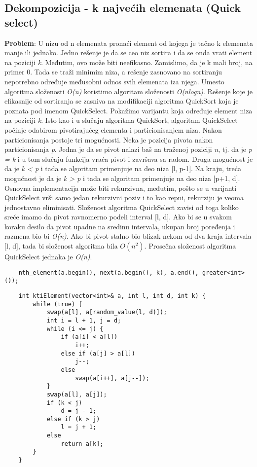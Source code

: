 \documentclass{article}
\begin{document}
\subsection{Dekompozicija - k najvećih elemenata (Quick select)}
\textbf{Problem}: U nizu od n elemenata pronaći element od kojega je tačno k elemenata
manje ili jednako.
\newline
Jedno rešenje je da se ceo niz sortira i da se onda vrati element na poziciji \textit{k}.
Međutim, ovo može biti neefikasno. Zamislimo, da je k mali broj, na primer
0. Tada se traži minimim niza, a rešenje zasnovano na sortiranju nepotrebno
određuje međusobni odnos svih elemenata iza njega. Umesto algoritma složenosti
\textit{O(n)} koristimo algoritam složenosti \textit{O(nlogn)}.
\newline
Rešenje koje je efikasnije od sortiranja se zasniva na modifikaciji algoritma
QuickSort koja je poznata pod imenom QuickSelect. Pokažimo varijantu koja
određuje element niza na poziciji \textit{k}.
\newline
Isto kao i u slučaju algoritma QuickSort, algoritam QuickSelect počinje odabirom
pivotirajućeg elementa i particionisanjem niza. Nakon particionisanja postoje tri
mogućnosti. Neka je pozicija pivota nakon particionisanja \textit{p}. Jedna je da se pivot
nalazi baš na traženoj poziciji \textit{n}, tj. da je \textit{p = k} i u tom slučaju funkcija vraća
pivot i završava sa radom. Druga mogućnost je da je \textit{k < p} i tada se algoritam
primenjuje na deo niza [l, p-1]. Na kraju, treća mogućnost je da je 
\textit{k > p} i
tada se algoritam primenjuje na deo niza [p+1, d]. Osnovna implementacija
može biti rekurzivna, međutim, pošto se u varijanti QuickSelect vrši samo jedan rekurzivni poziv i to
kao repni, rekurziju je veoma jednostavno eliminisati.
\newline
Složenost algoritma QuickSelect zavisi od
toga koliko sreće imamo da pivot ravnomerno podeli interval [l, d]. Ako bi se u
svakom koraku desilo da pivot upadne na sredinu intervala, ukupan broj poređenja
i razmena bio bi \textit{O(n)}. Ako bi pivot stalno bio
blizak nekom od dva kraja intervala [l, d], tada bi složenost algoritma bila $O(n^2)$.
Prosečna složenost algoritma QuickSelect jednaka je \textit{O(n)}.
\begin{lstlisting}
    nth_element(a.begin(), next(a.begin(), k), a.end(), greater<int>());
\end{lstlisting}
\begin{lstlisting}
    int ktiElement(vector<int>& a, int l, int d, int k) {
        while (true) {
            swap(a[l], a[random_value(l, d)]);
            int i = l + 1, j = d;
            while (i <= j) {
                if (a[i] < a[l])
                    i++;
                else if (a[j] > a[l])
                    j--;
                else
                    swap(a[i++], a[j--]);
            }
            swap(a[l], a[j]);
            if (k < j)
                d = j - 1;
            else if (k > j)
                l = j + 1;
            else
                return a[k];
        }
    }
\end{lstlisting}
\end{document}
